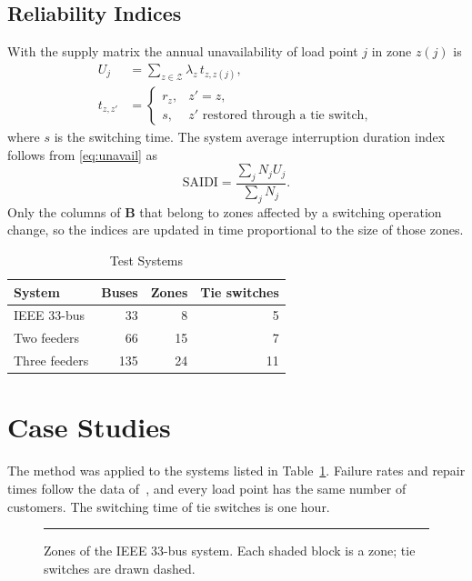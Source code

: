 \documentclass[journal]{IEEEtran}
\begin{document}
\subsection{Reliability Indices}
With the supply matrix the annual unavailability of load point $j$ in zone $z(j)$ is
\begin{align}
U_j &= \sum_{z \in \mathcal{Z}} \lambda_z\, t_{z,z(j)}, \label{eq:unavail}\\
t_{z,z'} &=
\begin{cases}
r_z, & z' = z,\\
s, & z' \text{ restored through a tie switch},
\end{cases}\nonumber
\end{align}
where $s$ is the switching time. The system average interruption duration index follows from
\eqref{eq:unavail} as
\begin{equation}
\mathrm{SAIDI} = \frac{\sum_j N_j U_j}{\sum_j N_j}.
\label{eq:saidi}
\end{equation}
Only the columns of $\mathbf{B}$ that belong to zones affected by a switching operation change,
so the indices are updated in time proportional to the size of those zones.

\begin{table}[!t]
\caption{Test Systems}
\label{tab:systems}
\centering
\begin{tabular}{lrrr}
\toprule
System & Buses & Zones & Tie switches\\
\midrule
IEEE 33-bus & 33 & 8 & 5\\
Two feeders & 66 & 15 & 7\\
Three feeders & 135 & 24 & 11\\
\bottomrule
\end{tabular}
\end{table}

\section{Case Studies}
The method was applied to the systems listed in Table~\ref{tab:systems}. Failure rates and
repair times follow the data of~\cite{allan1991}, and every load point has the same number of
customers. The switching time of tie switches is one hour.

\begin{figure}[!t]
\centering
\rule{0.8\columnwidth}{0.4\columnwidth}
\caption{Zones of the IEEE 33-bus system. Each shaded block is a zone; tie switches are drawn
dashed.}
\label{fig:zones}
\end{figure}
\end{document}
